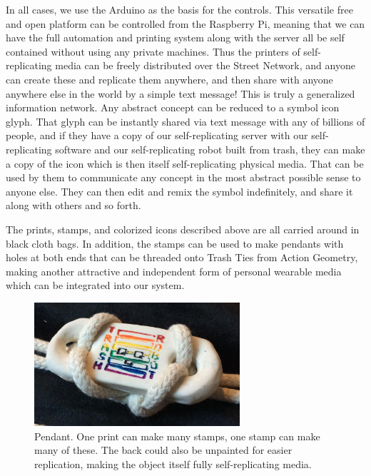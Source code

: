 In all cases, we use the Arduino as the basis for the controls.  This versatile free and open platform can be controlled from the Raspberry Pi, meaning that we can have the full automation and printing system along with the server all be self contained without using any private machines.  Thus the printers of self-replicating media can be freely distributed over the Street Network, and anyone can create these and replicate them anywhere, and then share with anyone anywhere else in the world by a simple text message! This is truly a generalized information network.  Any abstract concept can be reduced to a symbol icon glyph.  That glyph can be instantly shared via text message with any of billions of people, and if they have a copy of our self-replicating server with our self-replicating software and our self-replicating robot built from trash, they can make a copy of the icon which is then itself self-replicating physical media.  That can be used by them to communicate any concept in the most abstract possible sense to anyone else.  They can then edit and remix the symbol indefinitely, and share it along with others and so forth.

The prints, stamps, and colorized icons described above are all carried around in black cloth bags.  In addition, the stamps can be used to make pendants with holes at both ends that can be threaded onto Trash Ties from Action Geometry, making another attractive and independent form of personal wearable media which can be integrated into our system.


\begin{figure}
	\centering
	\includegraphics[width=3in]{figures/machines/pendant.png}
	\caption[pendant]
	{Pendant.  One print can make many stamps, one stamp can make many of these.  The back could also be unpainted for easier replication, making the object itself fully self-replicating media.}
\end{figure}
